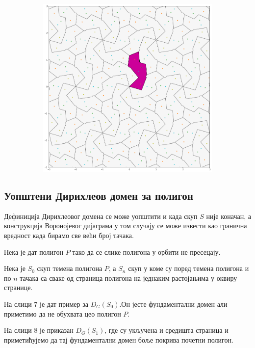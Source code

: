 \documentclass[12pt]{article}
\begin{document}
\begin{samepage}
\begin{figure}[H]
\begin{subfigure}[b]{0.32\textwidth}
    \label{fig:f5}
  \end{subfigure}
  \begin{subfigure}[b]{0.32\textwidth}
    \includegraphics[width=.9\textwidth]{visetacaka3.png}
    \label{fig:f6}
  \end{subfigure}
\end{figure}
\end{samepage}

    \subsection{Уопштени Дирихлеов домен за полигон}\label{modifikacija-fundamentalne-oblasti-na-osnovu-podfundamentalne}
Дефиниција Дирихлеовог домена се може уопштити и када скуп $S$ није коначан, а конструкција Воронојевог дијаграма у том случају се може извести као гранична вредност када бирамо све већи број тачака.

Нека је дат полигон $P$ тако да се слике полигона у орбити не пресецају. 


Нека је $S_0$ скуп темена полигона $P$, а $S_n$ скуп у коме су поред темена полигона и по $n$ тачака са сваке од страница полигона на једнаким растојањима у оквиру странице.

На слици 7 је дат пример за $D_G(S_0)$.Он јесте фундаментални домен али приметимо да не обухвата цео полигон $P$.

На слици 8 је приказан $D_G(S_1)$, где су укључена и средишта страница и приметићујемо да тај фундаментални домен боље покрива почетни полигон. 
\end{document}
